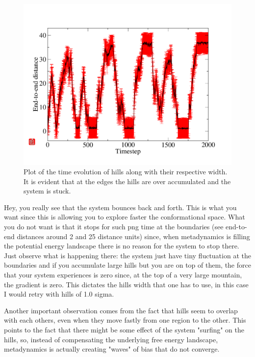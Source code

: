 \documentclass[10pt,fleqn,a4paper]{report}
\begin{document}
\begin{figure}[h!]
\begin{center}
\includegraphics[width=15cm,angle=0]{./figures/timeline}
\caption{Plot of the time evolution of hills along with their respective width. It is evident that at the edges the hills are over accumulated and the system is stuck.}
\label{timeline}
\end{center}
\end{figure} 

Hey, you really see that the system bounces back and forth. This is what you want since this is allowing you to explore faster the conformational space. What you do not want is that it stops for such png time at the boundaries (see end-to-end distances around 2 and 25 distance units) since, when metadynamics is filling the potential energy landscape there is no reason for the system to stop there. Just observe what is happening there: the system just have tiny fluctuation at the boundaries and if you accumulate large hills but you are on top of them, the force that your system experiences is zero since, at the top of a very large mountain, the gradient is zero. This dictates the hills width that one has to use, in this case I would retry with hills of 1.0 sigma.

Another important observation comes from the fact that hills seem to overlap with each others, even when they move fastly from one region to the other. This points to the fact that there might be some effect of the system "surfing" on the hills, so, instead of compensating the underlying free energy landscape, metadynamics is actually creating "waves" of bias that do not converge.
\end{document}
